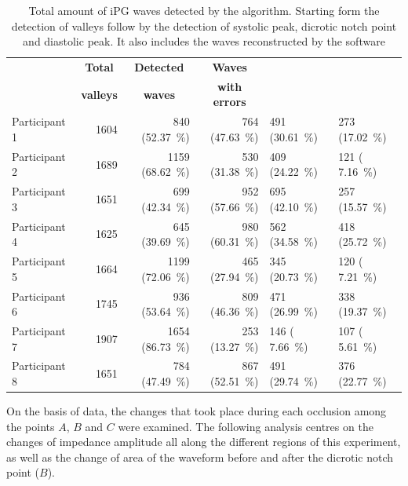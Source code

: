 \begin{table}[!htbp]
	\caption[Total amount of iPG waves detected by the algorithm]{Total amount of iPG waves detected by the algorithm. Starting form the detection of valleys follow by the detection of systolic peak, dicrotic notch point and diastolic peak. It also includes the waves reconstructed by the software}
	\label{tbl:detect APA}
	\centering\small
	\begin{tabular}{lrrr>{\columncolor[gray]{0.8}}l>{\columncolor[gray]{0.9}}l}
		\toprule
		& \multicolumn{1}{c}{\textbf{Total}}
		& \multicolumn{1}{c}{\textbf{Detected}} & \multicolumn{1}{c}{\textbf{Waves}}& \multicolumn{1}{c}{\textbf{Fixed}} & \multicolumn{1}{c}{\textbf{Discarded}} \\
		& \multicolumn{1}{c}{\textbf{valleys}} & \multicolumn{1}{c}{\textbf{waves}} & \multicolumn{1}{c}{\textbf{with errors}}& \multicolumn{1}{c}{\textbf{waves}} & \multicolumn{1}{c}{\textbf{waves}} \\
		\midrule
		Participant 1	&1604	& 840 (\SI{52.37}{\percent})	&764 (\SI{47.63}{\percent})	&491 (\SI{30.61}{\percent})	&273 (\SI{17.02}{\percent})\\
		Participant 2	&1689	&1159 (\SI{68.62}{\percent})	&530 (\SI{31.38}{\percent})	&409 (\SI{24.22}{\percent})	&121 ( \SI{7.16}{\percent})\\
		Participant 3	&1651	& 699 (\SI{42.34}{\percent})	&952 (\SI{57.66}{\percent})	&695 (\SI{42.10}{\percent})	&257 (\SI{15.57}{\percent})\\
		Participant 4	&1625	& 645 (\SI{39.69}{\percent})	&980 (\SI{60.31}{\percent})	&562 (\SI{34.58}{\percent})	&418 (\SI{25.72}{\percent})\\
		Participant 5	&1664	&1199 (\SI{72.06}{\percent})	&465 (\SI{27.94}{\percent})	&345 (\SI{20.73}{\percent})	&120 ( \SI{7.21}{\percent})\\
		Participant 6	&1745	& 936 (\SI{53.64}{\percent})	&809 (\SI{46.36}{\percent})	&471 (\SI{26.99}{\percent})	&338 (\SI{19.37}{\percent})\\
		Participant 7	&1907	&1654 (\SI{86.73}{\percent})	&253 (\SI{13.27}{\percent})	&146 ( \SI{7.66}{\percent})	&107 ( \SI{5.61}{\percent})\\
		Participant 8	&1651	& 784 (\SI{47.49}{\percent})	&867 (\SI{52.51}{\percent})	&491 (\SI{29.74}{\percent})	&376 (\SI{22.77}{\percent})\\
		\bottomrule
	\end{tabular}
\end{table}

On the basis of data, the changes that took place during each occlusion among the points $A$, $B$ and $C$ were examined. The following analysis centres on the changes of impedance amplitude all along the different regions of this experiment, as well as the change of area of the waveform before and after the dicrotic notch point ($B$).

